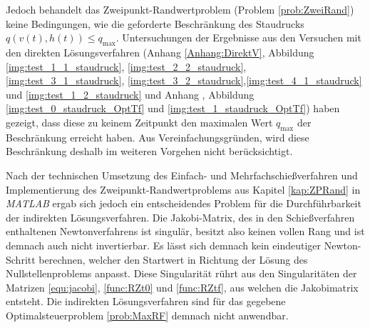 Jedoch behandelt das Zweipunkt-Randwertproblem (Problem \ref{prob:ZweiRand}) keine Bedingungen, wie die geforderte Beschränkung des Staudrucks $q(v(t),h(t)) \leq q_{\max}$. Untersuchungen der Ergebnisse aus den Versuchen mit den direkten Lösungsverfahren (Anhang \ref{Anhang:DirektV}, Abbildung \ref{img:test_1_1_staudruck}, \ref{img:test_2_2_staudruck}, \ref{img:test_3_1_staudruck}, \ref{img:test_3_2_staudruck},\ref{img:test_4_1_staudruck} und \ref{img:test_1_2_staudruck} und Anhang \label{kap:OptTf}, Abbildung \ref{img:test_0_staudruck_OptTf} und \ref{img:test_1_staudruck_OptTf}) haben gezeigt, dass diese zu keinem Zeitpunkt den maximalen Wert $q_{\max}$ der Beschränkung erreicht haben. Aus Vereinfachungsgründen, wird diese Beschränkung deshalb im weiteren Vorgehen nicht berücksichtigt.

Nach der technischen Umsetzung des Einfach- und Mehrfachschießverfahren und Implementierung des Zweipunkt-Randwertproblems aus Kapitel \ref{kap:ZPRand} in \textit{MATLAB} ergab sich jedoch ein entscheidendes Problem für die Durchführbarkeit der indirekten Lösungsverfahren. Die Jakobi-Matrix, des in den Schießverfahren enthaltenen Newtonverfahrens ist singulär, besitzt also keinen vollen Rang und ist demnach auch nicht invertierbar. Es lässt sich demnach kein eindeutiger Newton-Schritt berechnen, welcher den Startwert in Richtung der Lösung des Nullstellenproblems anpasst. Diese Singularität rührt aus den Singularitäten der Matrizen \ref{equ:jacobi}, \ref{func:RZt0} und \ref{func:RZtf}, aus welchen die Jakobimatrix entsteht. Die indirekten Lösungsverfahren sind für das gegebene Optimalsteuerproblem \ref{prob:MaxRF} demnach nicht anwendbar.